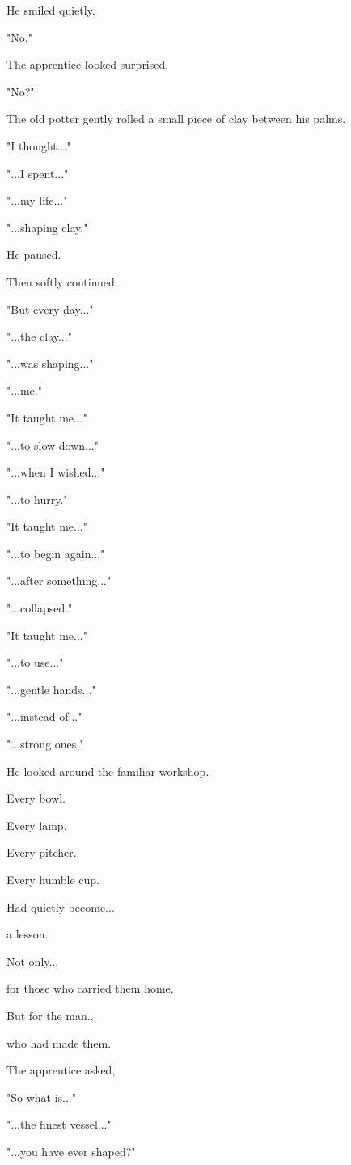 \documentclass[12pt,openany]{book}
\begin{document}
He smiled quietly.

"No."

The apprentice looked surprised.

"No?"

The old potter gently rolled a small piece of clay between his palms.

"I thought..."

"...I spent..."

"...my life..."

"...shaping clay."

He paused.

Then softly continued.

"But every day..."

"...the clay..."

"...was shaping..."

"...me."

"It taught me..."

"...to slow down..."

"...when I wished..."

"...to hurry."

"It taught me..."

"...to begin again..."

"...after something..."

"...collapsed."

"It taught me..."

"...to use..."

"...gentle hands..."

"...instead of..."

"...strong ones."

He looked around the familiar workshop.

Every bowl.

Every lamp.

Every pitcher.

Every humble cup.

Had quietly become...

a lesson.

Not only...

for those who carried them home.

But for the man...

who had made them.

The apprentice asked,

"So what is..."

"...the finest vessel..."

"...you have ever shaped?"
\end{document}

